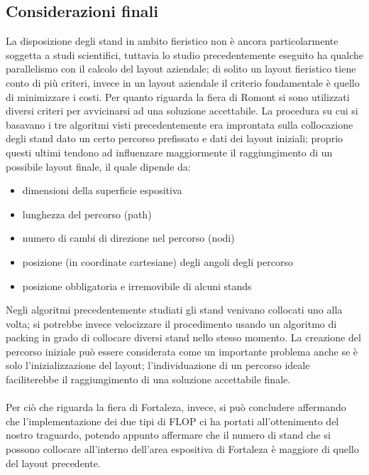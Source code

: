 \documentclass[12pt,a4paper,openright,twoside]{report}
\begin{document}
\subsection{Considerazioni finali}
La disposizione degli stand in ambito fieristico non \`{e} ancora particolarmente soggetta a studi scientifici, tuttavia lo studio precedentemente eseguito ha qualche parallelismo con il calcolo del layout aziendale; di solito un layout fieristico tiene conto di pi\`{u} criteri, invece in un layout aziendale il criterio fondamentale \`{e} quello di minimizzare i costi. Per quanto riguarda la fiera di Romont si sono utilizzati diversi criteri per avvicinarsi ad una soluzione accettabile.
La procedura su cui si basavano i tre algoritmi visti precedentemente era improntata sulla collocazione degli stand dato un certo percorso prefissato e dati dei layout iniziali; proprio questi ultimi tendono ad influenzare maggiormente il raggiungimento di un possibile layout finale, il quale dipende da:
\begin{multicols}{2}
\begin{itemize}
\item dimensioni della superficie espositiva
\item lunghezza del percorso (path)
\item numero di cambi di direzione nel percorso (nodi)
\item posizione (in coordinate cartesiane) degli angoli degli percorso
\item posizione obbligatoria e irremovibile di alcuni stands
\end{itemize}
\end{multicols}
Negli algoritmi precedentemente studiati gli stand venivano collocati uno alla volta; si potrebbe invece velocizzare il procedimento usando un algoritmo di packing in grado di collocare diversi stand nello stesso momento. La creazione del percorso iniziale pu\`{o} essere considerata come un importante problema anche se \`{e} solo l'inizializzazione del layout; l'individuazione di un percorso ideale faciliterebbe il raggiungimento di una soluzione accettabile finale. \\
\\Per ci\`{o} che riguarda la fiera di Fortaleza, invece, si pu\`{o} concludere affermando che l'implementazione dei due tipi di FLOP ci ha portati all'ottenimento del nostro traguardo, potendo appunto affermare che il numero di stand che si possono collocare all'interno dell'area espositiva di Fortaleza \`{e} maggiore di quello del layout precedente.\\
\end{document}
